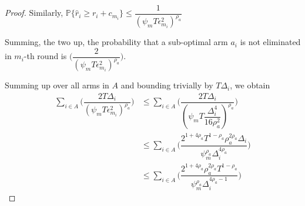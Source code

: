 \begin{proof}
 
Similarly, $\mathbb{P}\lbrace\hat{r}_{i}\geq r_{i} + c_{m_{i}}\rbrace\leq \dfrac{1}{(\psi_{m}T\epsilon_{m_{i}}^{2})^{\rho_{a}}}$
 
Summing, the two up, the probability that a sub-optimal arm $a_{i}$ is not eliminated in $m_{i}$-th round is  $\bigg(\dfrac{2}{(\psi_{m}T\epsilon_{m_{i}}^{2})^{\rho_{a}}}\bigg)$. 
 
Summing up over all arms in $A$ and bounding trivially by $T\Delta_{i}$, we obtain
   \begin{align*}
\sum_{i\in A}\bigg(\dfrac{2T\Delta_{i}}{(\psi_{m}T\epsilon_{m_{i}}^{2})^{\rho_{a}}}\bigg)
&\leq\sum_{i\in A}\bigg(\dfrac{2T\Delta_{i}}{(\psi_{m}T\dfrac{\Delta_{i}^{4}}{16\rho_{a}^{2}})^{\rho_{a}}}\bigg)\\
&\leq \sum_{i\in A}\bigg(\dfrac{2^{1+4\rho_{a}}T^{1-\rho_{a}}\rho_{a}^{2\rho_{a}}\Delta_{i}}{\psi_{m}^{\rho_{a}}\Delta_{i}^{4\rho_{a}}}\bigg)\\
&\leq \sum_{i\in A}\bigg(\dfrac{2^{1+4\rho_{a}}\rho_{a}^{2\rho_{a}}T^{1-\rho_{a}}}{\psi_{m}^{\rho_{a}}\Delta_{i}^{4\rho_{a}-1}}\bigg)    
   \end{align*}

% 




\end{proof}
